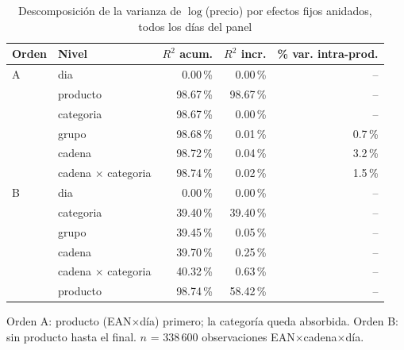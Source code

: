 \begin{table}[htbp]
\caption{Descomposici\'on de la varianza de $\log$(precio) por efectos fijos anidados, todos los d\'ias del panel}
\label{tab:varianza}
\centering\scriptsize\setlength{\tabcolsep}{3pt}
\begin{tabular}{@{}llrrr@{}}
\toprule
Orden & Nivel & $R^2$ acum. & $R^2$ incr. & \% var. intra-prod. \\
\midrule
A & dia & 0.00\,\% & 0.00\,\% & -- \\
 & producto & 98.67\,\% & 98.67\,\% & -- \\
 & categoria & 98.67\,\% & 0.00\,\% & -- \\
 & grupo & 98.68\,\% & 0.01\,\% & 0.7\,\% \\
 & cadena & 98.72\,\% & 0.04\,\% & 3.2\,\% \\
 & cadena $\times$ categoria & 98.74\,\% & 0.02\,\% & 1.5\,\% \\
\midrule
B & dia & 0.00\,\% & 0.00\,\% & -- \\
 & categoria & 39.40\,\% & 39.40\,\% & -- \\
 & grupo & 39.45\,\% & 0.05\,\% & -- \\
 & cadena & 39.70\,\% & 0.25\,\% & -- \\
 & cadena $\times$ categoria & 40.32\,\% & 0.63\,\% & -- \\
 & producto & 98.74\,\% & 58.42\,\% & -- \\
\bottomrule\end{tabular}
\par\smallskip\raggedright\scriptsize Orden A: producto (EAN$\times$d\'ia) primero; la categor\'ia queda absorbida. Orden B: sin producto hasta el final. $n$ = 338\,600 observaciones EAN$\times$cadena$\times$d\'ia.
\end{table}
